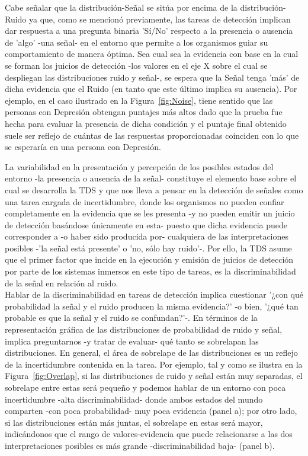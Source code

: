 \begin{itemize}
\begin{itemize}
Cabe señalar que la distribución-Señal se sitúa por encima de la distribución-Ruido ya que, como se mencionó previamente, las tareas de detección implican dar respuesta a una pregunta binaria 'Sí/No' respecto a la presencia o ausencia de 'algo' -una señal- en el entorno que permite a los organismos guiar su comportamiento de manera óptima. Sea cual sea la evidencia con base en la cual se forman los juicios de detección -los valores en el eje X sobre el cual se despliegan las distribuciones ruido y señal-, se espera que la Señal tenga 'más' de dicha evidencia que el Ruido (en tanto que este último implica su ausencia). Por ejemplo, en el caso ilustrado en la Figura~\ref{fig:Noise}, tiene sentido que las personas con Depresión obtengan puntajes más altos dado que la prueba fue hecha para evaluar la presencia de dicha condición y el puntaje final obtenido suele ser reflejo de cuántas de las respuestas proporcionadas coinciden con lo que se esperaría en una persona con Depresión.\\

     \end{itemize}

La variabilidad en la presentación y percepción de los posibles estados del entorno -la presencia o ausencia de la señal- constituye el elemento base sobre el cual se desarrolla la TDS y que nos lleva a pensar en la detección de señales como una tarea cargada de incertidumbre, donde los organismos no pueden confiar completamente en la evidencia que se les presenta -y no pueden emitir un juicio de detección basándose únicamente en esta- puesto que dicha evidencia puede corresponder a -o haber sido producida por- cualquiera de las interpretaciones posibles -'la señal está presente' o 'no, sólo hay ruido'-. Por ello, la TDS asume que el primer factor que incide en la ejecución y emisión de juicios de detección por parte de los sistemas inmersos en este tipo de tareas, es la discriminabilidad de la señal en relación al ruido.\\

Hablar de la discriminabilidad en tareas de detección implica cuestionar '¿con qué probabilidad la señal y el ruido producen la misma evidencia?' -o bien, '¿qué tan probable es que la señal y el ruido se confundan?'-. En términos de la representación gráfica de las distribuciones de probabilidad de ruido y señal, implica preguntarnos -y tratar de evaluar- qué tanto se sobrelapan las distribuciones. En general, el área de sobrelape de las distribuciones es un reflejo de la incertidumbre contenida en la tarea. Por ejemplo, tal y como se ilustra en la Figura~\ref{fig:Overlap}, si las distribuciones de ruido y señal están muy separadas, el sobrelape entre estas será pequeño y podemos hablar de un entorno con poca incertidumbre -alta discriminabilidad- donde ambos estados del mundo comparten -con poca probabilidad- muy poca evidencia (panel a); por otro lado, si las distribuciones están más juntas, el sobrelape en estas será mayor, indicándonos que el rango de valores-evidencia que puede relacionarse a las dos interpretaciones posibles es más grande -discriminabilidad baja- (panel b).\\


\end{itemize}
